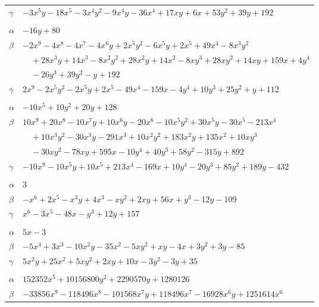 \documentclass[11pt]{article}
\begin{document}
\begin{longtable}{@{}ll@{}}
$\gamma$ & $-3x^{5}y-18x^{5}-3x^{4}y^{2}-9x^{4}y-36x^{4}+17xy+6x+53y^{2}+39y+192$\\
\addlinespace[3pt]
\multicolumn{2}{@{}l}{$\{i,j\}=\{36,39\}$, $k_{ij}=2^{7}\cdot 3$}\\
$\alpha$ & $-16y+80$\\
$\beta$ & $-2x^{9}-4x^{8}-4x^{7}-4x^{6}y+2x^{5}y^{2}-6x^{5}y+2x^{5}+49x^{4}-8x^{3}y^{2}$\\
 & $\quad +28x^{3}y+14x^{3}-8x^{2}y^{2}+28x^{2}y+14x^{2}-8xy^{3}+28xy^{2}+14xy+159x+4y^{4}$\\
 & $\quad -26y^{3}+39y^{2}-y+192$\\
$\gamma$ & $2x^{9}-2x^{5}y^{2}-2x^{5}y+2x^{5}-49x^{4}-159x-4y^{4}+10y^{3}+25y^{2}+y+112$\\
\addlinespace[3pt]
\multicolumn{2}{@{}l}{$\{i,j\}=\{36,41\}$, $k_{ij}=2^{2}\cdot 3\cdot 11^{2}$}\\
$\alpha$ & $-10x^{5}+10y^{2}+20y+128$\\
$\beta$ & $10x^{9}+20x^{8}-10x^{7}y+10x^{6}y-20x^{6}-10x^{5}y^{2}+30x^{5}y-30x^{5}-213x^{4}$\\
 & $\quad +10x^{3}y^{2}-30x^{3}y-291x^{3}+10x^{2}y^{2}+183x^{2}y+135x^{2}+10xy^{3}$\\
 & $\quad -30xy^{2}-78xy+595x-10y^{4}+40y^{3}+58y^{2}-315y+892$\\
$\gamma$ & $-10x^{9}-10x^{5}y+10x^{5}+213x^{4}-169x+10y^{4}-20y^{3}+85y^{2}+189y-432$\\
\addlinespace[3pt]
\multicolumn{2}{@{}l}{$\{i,j\}=\{37,39\}$, $k_{ij}=2\cdot 3^{3}\cdot 7$}\\
$\alpha$ & $3$\\
$\beta$ & $-x^{6}+2x^{5}-x^{3}y+4x^{3}-xy^{2}+2xy+56x+y^{3}-12y-109$\\
$\gamma$ & $x^{6}-3x^{5}-48x-y^{3}+12y+157$\\
\addlinespace[3pt]
\multicolumn{2}{@{}l}{$\{i,j\}=\{37,41\}$, $k_{ij}=2^{2}\cdot 3\cdot 11$}\\
$\alpha$ & $5x-3$\\
$\beta$ & $-5x^{4}+3x^{3}-10x^{2}y-35x^{2}-5xy^{2}+xy-4x+3y^{2}+3y-85$\\
$\gamma$ & $5x^{2}y+25x^{2}+5xy^{2}+2xy+10x-3y^{2}-3y+35$\\
\addlinespace[3pt]
\multicolumn{2}{@{}l}{$\{i,j\}=\{39,42\}$, $k_{ij}=2^{3}\cdot 3^{2}\cdot 17^{2}$}\\
$\alpha$ & $152352x^{5}+10156800y^{2}+2290570y+1280126$\\
$\beta$ & $-33856x^{9}-118496x^{8}-101568x^{7}y+118496x^{7}-16928x^{6}y+1251614x^{6}$\\

\end{longtable}
\end{document}
